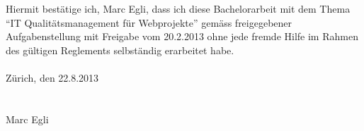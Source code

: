 Hiermit bestätige ich, Marc Egli, dass ich diese Bachelorarbeit mit dem Thema ``IT Qualitätsmanagement für Webprojekte'' gemäss freigegebener Aufgabenstellung mit Freigabe vom 20.2.2013 ohne jede fremde Hilfe im Rahmen des gültigen Reglements selbständig erarbeitet habe.\\
\\
Zürich, den 22.8.2013\\
\\\\
Marc Egli
